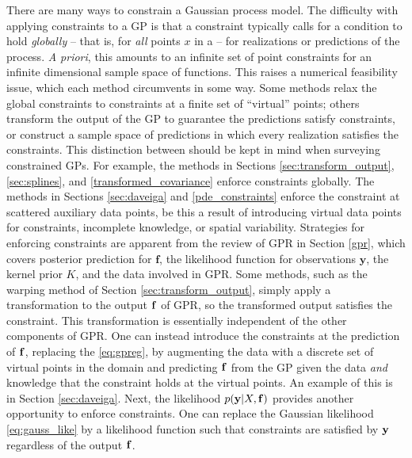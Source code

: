 \label{overview_of_constraints}
There are many ways to constrain a Gaussian process model.
The difficulty with applying constraints to a GP is that a constraint typically calls for a condition to hold \emph{globally} -- that is, for
\emph{all} points $x$ in a  -- for  realizations or predictions of the process. \emph{A priori}, this amounts to an infinite set of point constraints for an infinite dimensional sample space of functions. This raises a numerical feasibility issue, which each method circumvents in some way. Some methods relax the global constraints to constraints at a finite set of ``virtual'' points; others transform the output of the GP to guarantee the predictions satisfy constraints, or construct a sample space of predictions in which every realization satisfies the constraints. 
This distinction between should be kept in mind when surveying constrained GPs. For example, the methods in Sections \ref{sec:transform_output}, \ref{sec:splines}, and \ref{transformed_covariance} enforce constraints globally. The methods in Sections \ref{sec:daveiga} and \ref{pde_constraints} enforce the constraint at scattered auxiliary data points, be this a result of introducing virtual data points for constraints, incomplete knowledge, or spatial variability.
Strategies for enforcing constraints are apparent from the review of GPR in Section \ref{gpr}, which covers posterior prediction for $\mathbf{f}$, the likelihood function for observations $\mathbf{y}$, the kernel prior $K$, and the data involved in GPR.   
Some methods, such as the warping method of Section \ref{sec:transform_output}, simply 
apply a transformation to the output $\bold{f}$ of GPR, so the transformed output satisfies the constraint. 
This transformation is essentially independent of the other components of GPR.
One can instead introduce the constraints at the prediction of $\bold{f}$, replacing the  \eqref{eq:gpreg}, by augmenting the data with a discrete set of virtual points in the domain and predicting $\bold{f}$ from the GP given the data \emph{and} knowledge that the constraint holds at the virtual points. An example of this is in Section \ref{sec:daveiga}. 
Next, the likelihood $p(\bold{y}|X,\bold{f})$ provides another opportunity to enforce constraints. One can replace the Gaussian likelihood  \eqref{eq:gauss_like} by a likelihood function such that constraints are satisfied by $\bold{y}$ regardless of the output $\bold{f}$.
